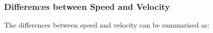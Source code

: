       \label{m38791*uid37}
            \subsubsection{ Differences between Speed and Velocity}
            \nopagebreak
            
        
        \label{m38791*id66482}The differences between speed and velocity can be summarised as:\par 
        
    
      
    
    \setlength\mytablespace{4\tabcolsep}
    \addtolength\mytablespace{3\arrayrulewidth}
    \setlength\mytablewidth{\linewidth}
        
    
    \setlength\mytableroom{\mytablewidth}
    \addtolength\mytableroom{-\mytablespace}
    
    \setlength\myfixedwidth{0pt}
    \setlength\mystarwidth{\mytableroom}
        \addtolength\mystarwidth{-\myfixedwidth}
        \divide{}
        
